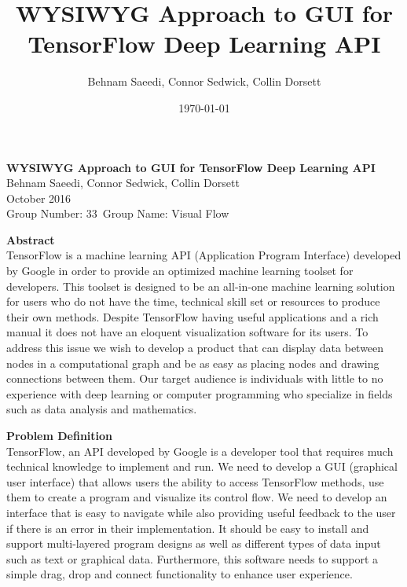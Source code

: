 \documentclass[a4paper,10pt]{IEEETran} \usepackage[margin=1.0in]{geometry} \usepackage{pdfpages} \usepackage{graphicx}
\title{WYSIWYG Approach to GUI for TensorFlow Deep Learning API}
\author{Behnam Saeedi, Connor Sedwick, Collin Dorsett}
\date{\today}
\newcommand*\Title{WYSIWYG Approach to GUI for TensorFlow Deep Learning API}
\newcommand*\Date{October 2016}
\newcommand*\Author{Behnam Saeedi, Connor Sedwick, Collin Dorsett}
\newcommand*\GroupNumber{Group Number: 33}
\newcommand*\GroupName{Group Name: Visual Flow}
\begin{document}
	\begin{titlepage}
%	
		\vspace*{\fill}
			\begin{center}
				\noindent \textbf{\Huge\Title} \\ 
				\large\Author \\ 
				\large\Date \\ 
				\large\GroupNumber \, \large\GroupName 
			\end{center}
			\noindent \textbf{Abstract} \\
			\indent TensorFlow is a machine learning API (Application Program Interface) developed by Google in order to provide an optimized machine learning toolset for developers.
			 This toolset is designed to be an all-in-one machine learning solution for users who do not have the time, technical skill set or resources to produce their own methods.
			 Despite TensorFlow having useful applications and a rich manual it does not have an eloquent visualization software for its users.
			 To address this issue we wish to develop a product that can display data between nodes in a computational graph and be as easy as placing nodes and drawing connections between them. Our target audience is individuals with little to no experience with deep learning or computer programming who specialize in fields such as data analysis and mathematics.\\
		\vspace*{\fill}
	\end{titlepage}

	\noindent \textbf{Problem Definition}\\
	\indent TensorFlow, an API developed by Google is a developer tool that requires much technical knowledge to implement and run.
	 We need to develop a GUI (graphical user interface) that allows users the ability to access TensorFlow methods, use them to create a program and visualize its control flow.
	 We need to develop an interface that is easy to navigate while also providing useful feedback to the user if there is an error in their implementation.
	 It should be easy to install and support multi-layered program designs as well as different types of data input such as text or graphical data.
	 Furthermore, this software needs to support a simple drag, drop and connect functionality to enhance user experience.\\
\end{document}
